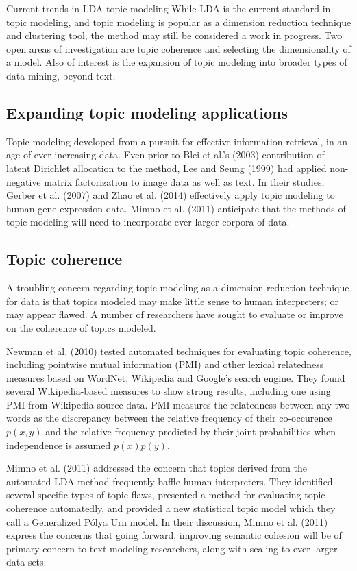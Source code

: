 \documentclass[11pt]{article}
\begin{document}
\begin{section}{Current trends in LDA topic modeling }
While LDA is the current standard in topic modeling, and topic modeling is popular as a dimension reduction technique and clustering tool, the method may still be considered a work in progress. Two open areas of investigation are topic coherence and selecting the dimensionality of a model. Also of interest is the expansion of topic modeling into broader types of data mining, beyond text. 


\subsection{Expanding topic modeling applications}
Topic modeling developed from a pursuit for effective information retrieval, in an age of ever-increasing data. Even prior to Blei et al.'s (2003) contribution of latent Dirichlet allocation to the method, Lee and Seung (1999) had applied non-negative matrix factorization to image data as well as text. In their studies, Gerber et al. (2007) and Zhao et al. (2014) effectively apply topic modeling to human gene expression data. Mimno et al. (2011) anticipate that the methods of topic modeling will need to incorporate ever-larger corpora of data.


\subsection{Topic coherence}
A troubling concern regarding topic modeling as a dimension reduction technique for data is that topics modeled may make little sense to human interpreters; or may appear flawed. A number of researchers have sought to evaluate or improve on the coherence of topics modeled. 

Newman et al. (2010) tested automated techniques for evaluating topic coherence, including pointwise mutual information (PMI) and other lexical relatedness measures based on WordNet, Wikipedia and Google's search engine. They found several Wikipedia-based measures to show strong results, including one using PMI from Wikipedia source data. PMI measures the relatedness between any two words as the discrepancy between the relative frequency of their co-occurence $p(x,y)$ and the relative frequency predicted by their joint probabilities when independence is assumed $p(x)p(y)$. 

Mimno et al. (2011) addressed the concern that topics derived from the automated LDA method frequently baffle human interpreters. They identified several specific types of topic flaws, presented a method for evaluating topic coherence automatedly, and provided a new statistical topic model which they call a Generalized P\'{o}lya Urn model. In their discussion, Mimno et al. (2011) express the concerns that going forward, improving semantic cohesion will be of primary concern to text modeling researchers, along with scaling to ever larger data sets. 


\end{section}
\end{document}
